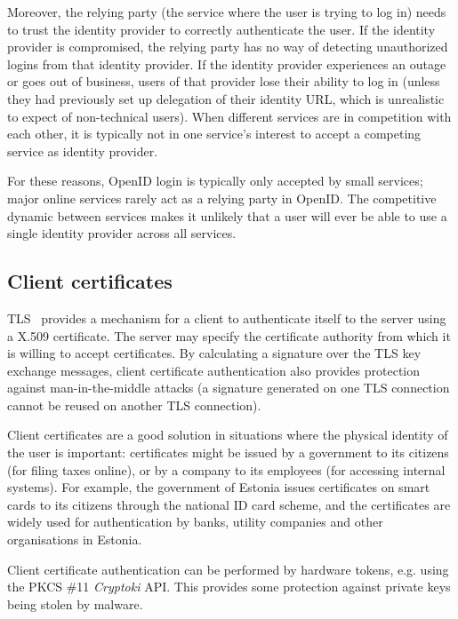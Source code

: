 Moreover, the relying party (the service where the user is trying to log in) needs to trust the
identity provider to correctly authenticate the user.  If the identity provider is compromised, the
relying party has no way of detecting unauthorized logins from that identity provider. If the
identity provider experiences an outage or goes out of business, users of that provider lose their
ability to log in (unless they had previously set up delegation of their identity URL, which is
unrealistic to expect of non-technical users). When different services are in competition with each
other, it is typically not in one service's interest to accept a competing service as identity
provider.

For these reasons, OpenID login is typically only accepted by small services; major online services
rarely act as a relying party in OpenID. The competitive dynamic between services makes it unlikely
that a user will ever be able to use a single identity provider across all services.

\subsection{Client certificates}

TLS~\cite{TLS} provides a mechanism for a client to authenticate itself to the server using a X.509
certificate. The server may specify the certificate authority from which it is willing to accept
certificates. By calculating a signature over the TLS key exchange messages, client certificate
authentication also provides protection against man-in-the-middle attacks (a signature generated on
one TLS connection cannot be reused on another TLS connection).

Client certificates are a good solution in situations where the physical identity of the user is
important: certificates might be issued by a government to its citizens (for filing taxes online),
or by a company to its employees (for accessing internal systems). For example, the government of
Estonia issues certificates on smart cards to its citizens through the national ID card scheme, and
the certificates are widely used for authentication by banks, utility companies and other
organisations in Estonia.~\cite{Parsovs14}

Client certificate authentication can be performed by hardware tokens, e.g. using the PKCS \#11
\emph{Cryptoki} API. This provides some protection against private keys being stolen by malware.

